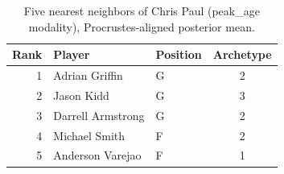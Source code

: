 \begin{table}[htbp]
  \centering\small
  \begin{tabular}{rllc}
    \toprule
    Rank & Player & Position & Archetype \\
    \midrule
    1 & Adrian Griffin & G & 2 \\
    2 & Jason Kidd & G & 3 \\
    3 & Darrell Armstrong & G & 2 \\
    4 & Michael Smith & F & 2 \\
    5 & Anderson Varejao & F & 1 \\
    \bottomrule
  \end{tabular}
  \caption{Five nearest neighbors of Chris Paul (peak_age modality), Procrustes-aligned posterior mean.}
  \label{tab:Chris_Paul_neighbors_peak_age}
\end{table}

